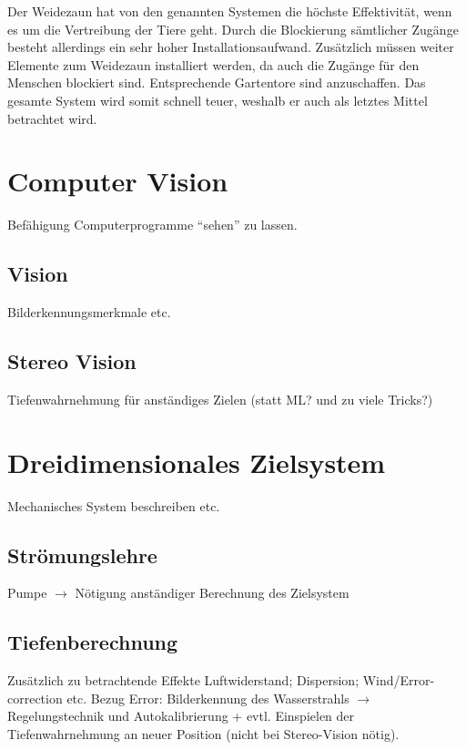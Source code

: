 Der Weidezaun hat von den genannten Systemen die höchste Effektivität, wenn es um die Vertreibung der Tiere geht. Durch die Blockierung sämtlicher Zugänge besteht allerdings ein sehr hoher Installationsaufwand. Zusätzlich müssen weiter Elemente zum Weidezaun installiert werden, da auch die Zugänge für den Menschen blockiert sind. Entsprechende Gartentore sind anzuschaffen. Das gesamte System wird somit schnell teuer, weshalb er auch als letztes Mittel betrachtet wird.


\section{Computer Vision}

Befähigung Computerprogramme "`sehen"' zu lassen.

\subsection{Vision}

Bilderkennungsmerkmale etc.

\subsection{Stereo Vision}

Tiefenwahrnehmung für anständiges Zielen (statt ML? und zu viele Tricks?)

\section{Dreidimensionales Zielsystem}

Mechanisches System beschreiben etc.

\subsection{Strömungslehre}

Pumpe $\rightarrow$ Nötigung anständiger Berechnung des Zielsystem

\subsection{Tiefenberechnung}

Zusätzlich zu betrachtende Effekte Luftwiderstand; Dispersion; Wind/Error-correction etc.
Bezug Error: Bilderkennung des Wasserstrahls $\rightarrow$ Regelungstechnik und Autokalibrierung
+ evtl. Einspielen der Tiefenwahrnehmung an neuer Position (nicht bei Stereo-Vision nötig).
